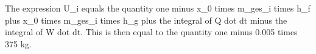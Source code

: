 The expression U_i equals the quantity one minus x_0 times m_ges_i times h_f plus x_0 times m_ges_i times h_g plus the integral of Q dot dt minus the integral of W dot dt. This is then equal to the quantity one minus 0.005 times 375 kg.